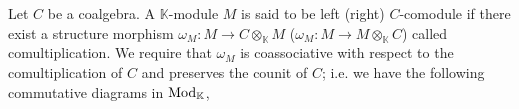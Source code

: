 \documentclass[../thesis.tex]{subfiles}
\begin{document}
                \begin{definition}[Comodules]
                    Let $C$ be a coalgebra. A $\mathbb{K}$-module $M$ is said to be left (right) $C$-comodule if there exist a structure morphism $\omega_M: M \rightarrow C\otimes_{\mathbb{K}}M$ ($\omega_M: M \rightarrow M\otimes_{\mathbb{K}}C$) called comultiplication. We require that $\omega_M$ is coassociative with respect to the comultiplication of $C$ and preserves the counit of $C$; i.e. we have the following commutative diagrams in $\tt{Mod}_\mathbb{K}$,
                    \begin{center}
                    \end{center}
                    

        
        


\end{definition}
\end{document}
